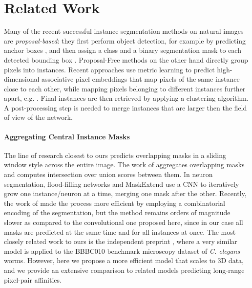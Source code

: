 
\section{Related Work} \label{sec:related_work}
Many of the recent successful instance segmentation methods on natural images are \emph{proposal-based}: they first perform object detection, for example by predicting anchor boxes \cite{ren2015faster}, and then assign a class and a binary segmentation mask to each detected bounding box \cite{he2017mask,porzi2019seamless}.
Proposal-Free methods on the other hand directly group pixels into instances. 
Recent approaches use metric learning to predict high-dimensional associative pixel embeddings that map pixels of the same instance close to each other, while mapping pixels belonging to different instances further apart, e.g. \cite{lee2019learning,kong2018recurrentPix}. %
Final instances are then retrieved by applying a clustering algorithm. A post-processing step is needed to merge instances that are larger then the field of view of the network. 

\paragraph{Aggregating Central Instance Masks}
The line of research closest to ours predicts overlapping \maskname masks in a sliding window style across the entire image. The work of \cite{liu2016multi} aggregates overlapping masks and computes intersection over union scores between them.
In neuron segmentation, flood-filling networks \cite{januszewski2018high} and MaskExtend \cite{meirovitch2016multi} use a CNN to iteratively grow one instance/neuron at a time, merging one mask after the other. Recently, the work of \cite{meirovitch2019cross} made the process more efficient by employing a combinatorial encoding of the segmentation, but the method remains orders of magnitude slower as compared to the convolutional one proposed here, since in our case all masks are predicted at the same time and for all instances at once.
The most closely related work to ours is the independent preprint \cite{hirsch2020patchperpix}, where a very similar model is applied to the BBBC010 benchmark microscopy dataset of \emph{C. elegans} worms. However, here we propose a more efficient model that scales to 3D data, and we provide an extensive comparison to related models predicting long-range pixel-pair affinities. 

